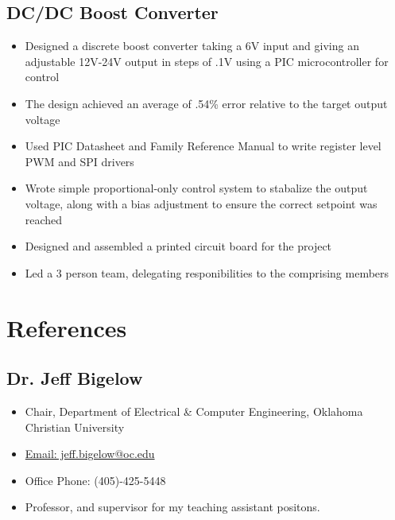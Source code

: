 \documentclass{article}
\begin{document}
\begin{spacing}{.5}
	\subsection{DC/DC Boost Converter \hfill {}}
		\begin{itemize}[label=--,itemsep=-.35ex]
			\item \large{Designed a discrete boost converter taking a 6V input and giving an adjustable 12V-24V output in steps of .1V using a PIC microcontroller for control}
			\item \large{The design achieved an average of .54\% error relative to the target output voltage}
			\item \large{Used PIC Datasheet and Family Reference Manual to write register level PWM and SPI drivers}
			\item \large{Wrote simple proportional-only control system to stabalize the output voltage, along with a bias adjustment to ensure the correct setpoint was reached}
			\item \large{Designed and assembled a printed circuit board for the project}
			\item \large{Led a 3 person team, delegating responibilities to the comprising members}
		\end{itemize}
\begin{comment}
	\subsection{RGB Laser Scanner Controller}
		\begin{itemize}[label=--,itemsep=-.35ex]
			\item \large{}
		\end{itemize}
\end{comment}

\section{References}
	\subsection{Dr. Jeff Bigelow}
		\begin{itemize}[label=--,itemsep=-.35ex]
			\item \large{Chair, Department of Electrical \& Computer Engineering, Oklahoma Christian University}
			\item \large{\href{mailto::jeff.bigelow@oc.edu}{\large{Email: jeff.bigelow@oc.edu}}}
			\item \large{Office Phone: (405)-425-5448}
			\item \large{Professor, and supervisor for my teaching assistant positons.}
		\end{itemize}

\end{spacing}
\end{document}
